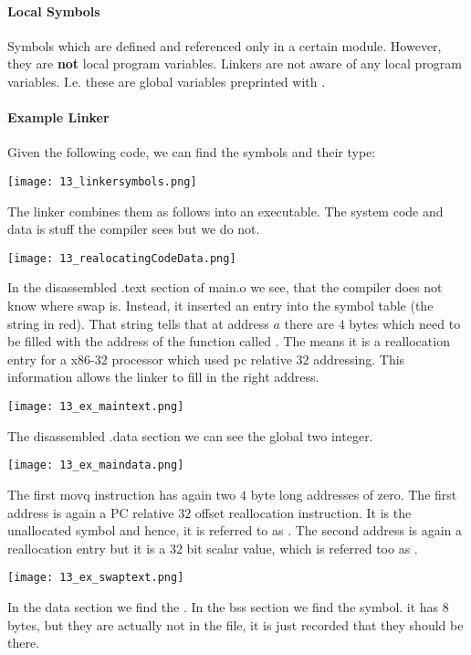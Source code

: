 \paragraph{Local Symbols}
Symbols which are defined and referenced only in a certain module. However, they are \textbf{not} local program variables. Linkers are not aware of any local program variables. I.e. these are global variables preprinted with .

\paragraph{Example Linker}
Given the following code, we can find the symbols and their type:

\texttt{[image: 13\_linkersymbols.png]}

The linker combines them as follows into an executable. The system code and data is stuff the compiler sees but we do not.

\texttt{[image: 13\_realocatingCodeData.png]}

In the disassembled .text section of main.o we see, that the compiler does not know where swap is. Instead, it inserted an entry into the symbol table (the string in red). That string tells that at address $a$ there are $4$ bytes which need to be filled with the address of the function called . The  means it is a reallocation entry for a x86-32 processor which used pc relative $32$ addressing. This information allows the linker to fill in the right address.

\texttt{[image: 13\_ex\_maintext.png]}

The disassembled .data section we can see the global two integer.

\texttt{[image: 13\_ex\_maindata.png]}

The first movq instruction has again two $4$ byte long addresses of zero. The first address is again a PC relative $32$ offset reallocation instruction. It is the unallocated  symbol and hence, it is referred to as . The second address is again a reallocation entry but it is a $32$ bit scalar value, which is referred too as .

\texttt{[image: 13\_ex\_swaptext.png]}

In the data section we find the . In the bss section we find the  symbol. it has $8$ bytes, but they are actually not in the file, it is just recorded that they should be there.

